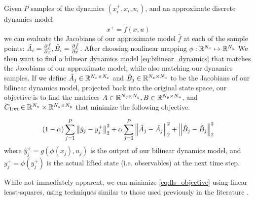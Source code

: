 \documentclass{article}
\begin{document}
  Given $P$ samples of the dynamics $(x_i^+, x_i, u_i)$, and an approximate discrete
  dynamics model 
  \begin{equation}
      x^+ = \tilde{f}(x,u)
  \end{equation}
  we can evaluate the Jacobians of our approximate model $\hat{f}$ at each of the sample
  points: $\tilde{A}_i = \pdv{\tilde{f}}{x}, \tilde{B}_i = \pdv{\tilde{f}}{x}$. After
  choosing nonlinear mapping $\phi : \mathbb{R}^{N_x} \mapsto \mathbb{R}^{N_y}$ We then want to find a
  bilinear dynamics model \eqref{eq:bilinear_dynamics} that matches the Jacobians of our
  approximate model, while also matching our dynamics samples. If we define $\hat{A}_j \in
  \mathbb{R}^{N_x \times N_x}$ and $\hat{B}_j \in \mathbb{R}^{N_x \times N_u}$ to be the Jacobians of our
  bilinear dynamics model, projected back into the original state space, our objective is to
  find the matrices $A \in \mathbb{R}^{N_y \times N_y},B \in \mathbb{R}^{N_y \times N_u}$, and $C_{1:m} \in
  \mathbb{R}^{N_u} \times \mathbb{R}^{N_y \times N_y}$ that minimize the following objective:

  \begin{equation} \label{eq:lls_objective}
      (1- \alpha) \sum_{j=1}^P \norm{\hat{y}_j - y_j^+}_2^2 + 
          \alpha  \sum_{j=1}^P \norm{\hat{A}_j - \tilde{A}_j}_2^2 + 
                               \norm{\hat{B}_j - \tilde{B}_j}_2^2 
  \end{equation}
  where $\hat{y}_j^+ = g\left(\phi(x_j), u_j\right)$ is the output of our bilinear  dynamics
  model, and $y_j^+ = \phi(y_j^+)$ is the actual lifted state (i.e. observables) at the next
  time step.

  While not immediately apparent, we can minimize \eqref{eq:lls_objective} using linear
  least-squares, using techniques similar to those used previously in the literature
  .
\end{document}
